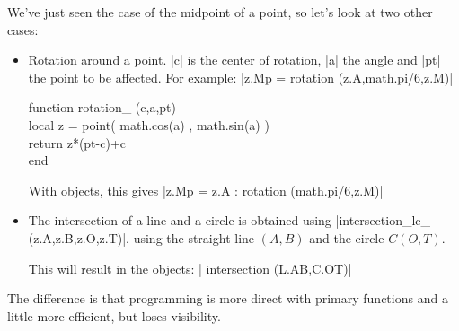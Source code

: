 We've just seen the case of the midpoint of a point, so let's look at two other cases:

\begin{itemize}
   \item Rotation around a point. |c| is the center of rotation, |a| the angle and |pt| the point to be affected.
  For example: |z.Mp = rotation (z.A,math.pi/6,z.M)|
   
\begin{mybox}
   function rotation\_ (c,a,pt)\\
     local z = point( math.cos(a) , math.sin(a) )\\
     return z*(pt-c)+c\\
   end \end{mybox}
   
   With objects, this gives |z.Mp = z.A : rotation (math.pi/6,z.M)|
   

\item  The intersection of a line and a circle is obtained using |intersection_lc_ (z.A,z.B,z.O,z.T)|.
 using the straight line $(A,B)$ and the circle $C(O,T)$.
 
 This will result in the objects: | intersection (L.AB,C.OT)|
\end{itemize}

The difference is that programming is more direct with primary functions and a little more efficient, but loses visibility.


